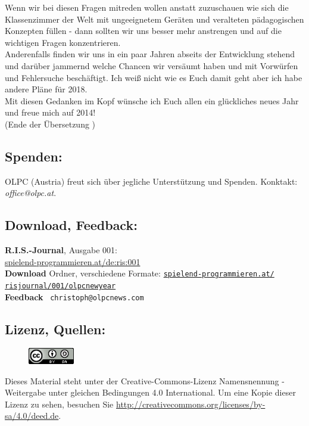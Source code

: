 Wenn wir bei diesen Fragen mitreden wollen anstatt zuzuschauen wie sich die Klassenzimmer der Welt mit ungeeignetem Geräten und veralteten pädagogischen Konzepten füllen - dann sollten wir uns besser mehr anstrengen und auf die wichtigen Fragen konzentrieren. \\

Anderenfalls finden wir uns in ein paar Jahren abseits der Entwicklung stehend und darüber jammernd welche Chancen wir versäumt haben und mit Vorwürfen und Fehlersuche beschäftigt. Ich weiß nicht wie es Euch damit geht aber ich habe andere Pläne für 2018. \\

Mit diesen Gedanken im Kopf wünsche ich Euch allen ein glückliches neues Jahr und freue mich auf 2014! \\

(Ende der Übersetzung )


\subsection*{Spenden:}

OLPC (Austria) freut sich über jegliche Unterstützung und Spenden. Konktakt: \textit{office@olpc.at}. \\

\subsection*{Download, Feedback:}
\textbf{R.I.S.-Journal}, Ausgabe 001: \\
\href{http://spielend-programmieren.at/de:ris:001}{spielend-programmieren.at/de:ris:001}\\
\textbf{Download} Ordner, verschiedene Formate: \href{http://spielend-programmieren.at/risjournal/001/olpcnewyear}{\texttt{spielend-programmieren.at/\\risjournal/001/olpcnewyear}} \\
\textbf{Feedback} \Letter\ \texttt{christoph@olpcnews.com} \\

\subsection*{Lizenz, Quellen:}
\begin{figure}
\includegraphics[width=2cm]{olpcnewyear/ccbysa88x31.png}
\end{figure}
Dieses Material steht unter der Creative-Commons-Lizenz Namensnennung - Weitergabe unter gleichen Bedingungen 4.0 International. Um eine Kopie dieser Lizenz zu sehen, besuchen Sie \url{http://creativecommons.org/licenses/by-sa/4.0/deed.de}.

